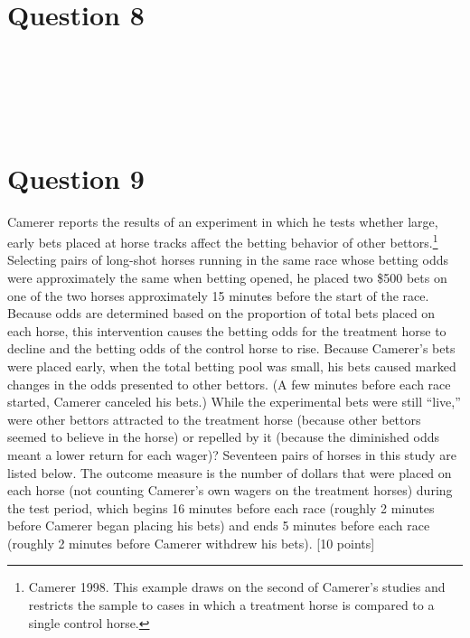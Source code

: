 \documentclass[11pt,notitlepage]{article}\usepackage[]{graphicx}\usepackage[]{color}
\makeatletter
\newenvironment{kframe}{%
 \def\at@end@of@kframe{}%
 \ifinner\ifhmode%
  \def\at@end@of@kframe{\end{minipage}}%
  \begin{minipage}{\columnwidth}%
 \fi\fi%
 \def\FrameCommand##1{\hskip\@totalleftmargin \hskip-\fboxsep
 \colorbox{shadecolor}{##1}\hskip-\fboxsep
     \hskip-\linewidth \hskip-\@totalleftmargin \hskip\columnwidth}%
 \MakeFramed {\advance\hsize-\width
   \@totalleftmargin\z@ \linewidth\hsize
   \@setminipage}}%
 {\par\unskip\endMakeFramed%
 \at@end@of@kframe}
\newenvironment{knitrout}{}{} %
\makeatother
\begin{document}
\section*{Question 8}
\begin{knitrout}
\color{fgcolor}\begin{kframe}
\begin{verbatim}






\end{verbatim}
\end{kframe}
\end{knitrout}

\section*{Question 9}

Camerer reports the results of an experiment in which he tests whether large, early bets placed at horse tracks affect the betting behavior of other bettors.\footnote{Camerer 1998.  This example draws on the second of Camerer's studies and restricts the sample to cases in which a treatment horse is compared to a single control horse.} Selecting pairs of long-shot horses running in the same race whose betting odds were approximately the same when betting opened, he placed two \$500 bets on one of the two horses approximately 15 minutes before the start of the race. Because odds are determined based on the proportion of total bets placed on each horse, this intervention causes the betting odds for the treatment horse to decline and the betting odds of the control horse to rise. Because Camerer's bets were placed early, when the total betting pool was small, his bets caused marked changes in the odds presented to other bettors. (A few minutes before each race started, Camerer canceled his bets.) While the experimental bets were still ``live,'' were other bettors attracted to the treatment horse (because other bettors seemed to believe in the horse) or repelled by it (because the diminished odds meant a lower return for each wager)? Seventeen pairs of horses in this study are listed below. The outcome measure is the number of dollars that were placed on each horse (not counting Camerer's own wagers on the treatment horses) during the test period, which begins 16 minutes before each race (roughly 2 minutes before Camerer began placing his bets) and ends 5 minutes before each race (roughly 2 minutes before Camerer withdrew his bets). [10 points]
\end{document}
